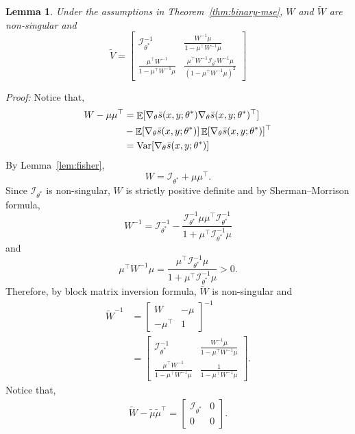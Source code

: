 \documentclass[11pt,a4paper]{article}
\DeclareMathOperator{\E}{\mathbb{E}}
\newcommand{\var}{\operatorname{Var}}
\newcommand{\wt}[1]{\widetilde{#1}}
\newcommand{\gtheta}{\ensuremath \nabla_{\theta}}
\newcommand{\ssf}[3]{\bar{s}(#1, #2; #3)}
\newcommand{\vb}{\wt{V}}
\newcommand{\wb}{\wt{W}}
\newcommand{\mub}{\wt{\mu}}
\newcommand{\fisher}{\mathcal{I}_{\theta^*}}
\newtheorem{lemma}{Lemma}[section]
\begin{document}
\begin{lemma} 
Under the assumptions in Theorem~\ref{thm:binary-mse}, $W$ and $\wb$ are non-singular and
\[
 \vb  = \begin{bmatrix} \fisher ^{-1}& \frac{W^{-1}\mu}{1-\mu^{\top}W^{-1}\mu} \\ \frac{\mu^\top W^{-1}}{1-\mu^{\top}W^{-1}\mu}&  \frac{\mu^{\top}W^{-1}\fisher W^{-1}\mu}{(1-\mu^{\top}W^{-1}\mu)^2} \end{bmatrix}
\]
\label{lem:w-mu-limit}
\end{lemma}
{\em Proof: }
Notice that, 
\begin{equation*}
\begin{aligned}
 W - \mu\mu^\top & = \E[\gtheta \ssf{x}{y}{\theta^*}\gtheta \ssf{x}{y}{\theta^*}^\top]  \\
 & -\E[\gtheta \ssf{x}{y}{\theta^*}]\E[\gtheta \ssf{x}{y}{\theta^*}]^\top \\
  & = \var[\gtheta \ssf{x}{y}{\theta^*}]
\end{aligned}
\end{equation*}
By Lemma~\ref{lem:fisher}, 
\[
 W =  \fisher + \mu\mu^\top. 
\]
Since $\fisher$ is non-singular, $W$ is strictly positive definite and by Sherman–Morrison formula, 
\[
W^{-1} = \fisher^{-1} - \frac{\fisher^{-1}\mu\mu^\top\fisher^{-1}}{1+\mu^\top\fisher^{-1}\mu}
\]
and
\[
\mu^\top W^{-1} \mu = \frac{\mu^\top\fisher^{-1}\mu}{1+\mu^\top\fisher^{-1}\mu} > 0.
\]
Therefore, by block matrix inversion formula, $\wb$ is non-singular and 
\begin{equation*}
\begin{aligned}
 \wb^{-1} &= \begin{bmatrix} W & -\mu\\ -\mu^\top & 1\end{bmatrix}^{-1} \\
 & = \begin{bmatrix} \fisher^{-1}& \frac{W^{-1}\mu}{1-\mu^{\top}W^{-1}\mu} \\ \frac{\mu^\top W^{-1}}{1-\mu^{\top}W^{-1}\mu}&  \frac{1}{1-\mu^{\top}W^{-1}\mu} \end{bmatrix}.
\end{aligned}
\end{equation*}
Notice that, 
\begin{equation*}
\begin{aligned}
\wb - \mub\mub^\top = \begin{bmatrix} \fisher  & 0\\ 0& 0\end{bmatrix}. 
\end{aligned}
\end{equation*}
\end{document}
